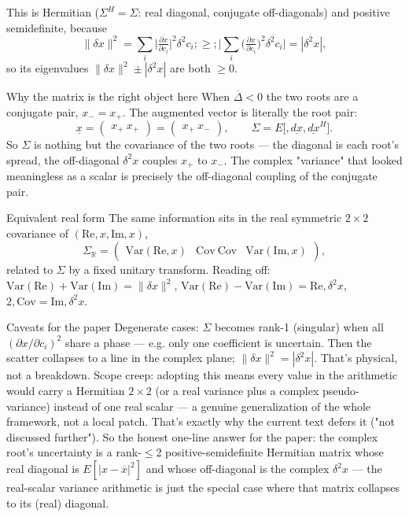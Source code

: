 \documentclass[twoside]{article}
\numberwithin{equation}{section}
\begin{document}
This is Hermitian ($\Sigma^H=\Sigma$: real diagonal, conjugate off-diagonals) and positive semidefinite, because
$$\lVert\delta x\rVert^2 = \sum_i \big|\tfrac{\partial x}{\partial c_i}\big|^2\delta^2 c_i ;\ge; \Big|\sum_i \big(\tfrac{\partial x}{\partial c_i}\big)^2\delta^2 c_i\Big| = |\delta^2 x|,$$
so its eigenvalues $\lVert\delta x\rVert^2 \pm |\delta^2 x|$ are both $\ge 0$.

Why the matrix is the right object here
When $\overline{\Delta}<0$ the two roots are a conjugate pair, $x_- = x_+^{}$. The augmented vector is literally the root pair:
$$\underline{x} = \begin{pmatrix} x_+ \ x_+^{}\end{pmatrix} = \begin{pmatrix} x_+ \ x_- \end{pmatrix}, \qquad \Sigma = E\big[,\underline{dx},\underline{dx}^H\big].$$
So $\Sigma$ is nothing but the covariance of the two roots — the diagonal is each root's spread, the off-diagonal $\delta^2 x$ couples $x_+$ to $x_-$. The complex "variance" that looked meaningless as a scalar is precisely the off-diagonal coupling of the conjugate pair.

Equivalent real form
The same information sits in the real symmetric $2\times2$ covariance of $(\text{Re},x,\text{Im},x)$,
$$\Sigma_{\mathbb R} = \begin{pmatrix}\mathrm{Var}(\mathrm{Re},x) & \mathrm{Cov} \ \mathrm{Cov} & \mathrm{Var}(\mathrm{Im},x)\end{pmatrix},$$
related to $\Sigma$ by a fixed unitary transform. Reading off: $\mathrm{Var}(\mathrm{Re})+\mathrm{Var}(\mathrm{Im}) = \lVert\delta x\rVert^2$, $\mathrm{Var}(\mathrm{Re})-\mathrm{Var}(\mathrm{Im}) = \mathrm{Re},\delta^2 x$, $2,\mathrm{Cov} = \mathrm{Im},\delta^2 x$.

Caveats for the paper
Degenerate cases: $\Sigma$ becomes rank-1 (singular) when all $(\partial x/\partial c_i)^2$ share a phase — e.g. only one coefficient is uncertain. Then the scatter collapses to a line in the complex plane; $\lVert\delta x\rVert^2 = |\delta^2 x|$. That's physical, not a breakdown.
Scope creep: adopting this means every value in the arithmetic would carry a Hermitian $2\times2$ (or a real variance plus a complex pseudo-variance) instead of one real scalar — a genuine generalization of the whole framework, not a local patch. That's exactly why the current text defers it ("not discussed further").
So the honest one-line answer for the paper: the complex root's uncertainty is a rank-$\leq$2 positive-semidefinite Hermitian matrix whose real diagonal is $E[|x-\overline{x}|^2]$ and whose off-diagonal is the complex $\delta^2 x$ — the real-scalar variance arithmetic is just the special case where that matrix collapses to its (real) diagonal.
\end{document}
